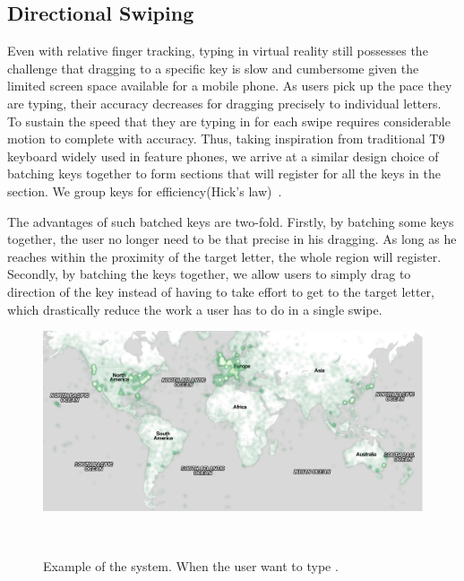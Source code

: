\subsection{Directional Swiping}
Even with relative finger tracking, typing in virtual reality still possesses the challenge that dragging to a specific key is slow and cumbersome given the limited screen space available for a mobile phone.
As users pick up the pace they are typing, their accuracy decreases for dragging precisely to individual letters.
To sustain the speed that they are typing in for each swipe requires considerable motion to complete with accuracy.
Thus, taking inspiration from traditional T9 keyboard widely used in feature phones, we arrive at a similar design choice of batching keys together to form sections that will register for all the keys in the section.
We group keys for efficiency(Hick's law)~\cite{card1983psychology}.

The advantages of such batched keys are two-fold.
Firstly, by batching some keys together, the user no longer need to be that precise in his dragging.
As long as he reaches within the proximity of the target letter, the whole region will register.
Secondly, by batching the keys together, we allow users to simply drag to direction of the key instead of having to take effort to get to the target letter, which drastically reduce the work a user has to do in a single swipe.




\begin{figure}
  \centering
  \includegraphics[width=1.75\columnwidth]{figures/map}
  \caption{Example of the system.  When the user want to type .}
  ~\label{fig:example}
\end{figure}



